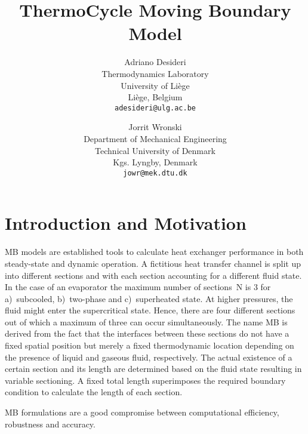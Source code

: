 \documentclass[11pt]{article} %
\title{ThermoCycle Moving Boundary Model}
\author{Adriano Desideri\\
\small Thermodynamics Laboratory\\[-0.8ex]
\small University of Li\`ege\\[-0.8ex]
\small Li\`ege, Belgium\\
\small \texttt{adesideri@ulg.ac.be}\\
\and
Jorrit Wronski\\
\small Department of Mechanical Engineering\\[-0.8ex]
\small Technical University of Denmark\\[-0.8ex]
\small Kgs. Lyngby, Denmark\\
\small \texttt{jowr@mek.dtu.dk}
}
\begin{document}

\maketitle


\section{Introduction and Motivation}

\Gls{MB} models are established tools to calculate heat exchanger performance in both steady-state and dynamic operation. A fictitious heat transfer channel is split up into different sections and with each section accounting for a different fluid state. In the case of an evaporator the maximum number of sections~\gls{N} is 3 for a)~subcooled, b)~two-phase and c)~superheated state. At higher pressures, the fluid might enter the supercritical state. Hence, there are four different sections out of which a maximum of three can occur simultaneously. The name \glsdesc{MB} is derived from the fact that the interfaces between these sections do not have a fixed spatial position but merely a fixed thermodynamic location depending on the presence of liquid and gaseous fluid, respectively. The actual existence of a certain section and its length are determined based on the fluid state resulting in variable sectioning. A fixed total length superimposes the required boundary condition to calculate the length of each section. 

\Glsdesc{MB} formulations are a good compromise between computational efficiency, robustness and accuracy\cite{Bendapudi2008}. 
\end{document}
